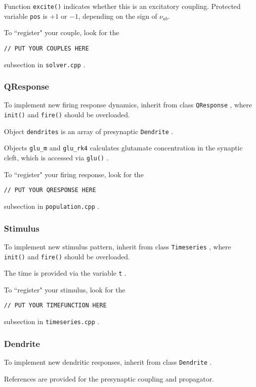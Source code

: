 \documentclass[12pt,a4paper]{article}
\newcommand{\type}[1]{ {\small\small\tt #1} }
\begin{document}
Function \type{excite()} indicates whether this is an excitatory coupling. Protected variable \type{pos} is $+1$ or $-1$, depending on the sign of \(\nu_{ab}\).

To ``register" your couple, look for the
\begin{lstlisting}
// PUT YOUR COUPLES HERE
\end{lstlisting}
subsection in \type{solver.cpp}.

\subsubsection{QResponse}

To implement new firing response dynamics, inherit from class \type{QResponse}, where \type{init()} and \type{fire()} should be overloaded.

Object \type{dendrites} is an array of presynaptic \type{Dendrite}.

Objects \type{glu\_m} and \type{glu\_rk4} calculates glutamate concentration in the synaptic cleft, which is accessed via \type{glu()}.

To ``register" your firing response, look for the
\begin{lstlisting}
// PUT YOUR QRESPONSE HERE
\end{lstlisting}
subsection in \type{population.cpp}.

\subsubsection{Stimulus}

To implement new stimulus pattern, inherit from class \type{Timeseries}, where \type{init()} and \type{fire()} should be overloaded.

The time is provided via the variable \type{t}.

To ``register" your stimulus, look for the
\begin{lstlisting}
// PUT YOUR TIMEFUNCTION HERE
\end{lstlisting}
subsection in \type{timeseries.cpp}.

\subsubsection{Dendrite}
\label{sec:dendrite}

To implement new dendritic responses, inherit from class \type{Dendrite}.

References are provided for the presynaptic coupling and propagator.
\end{document}
